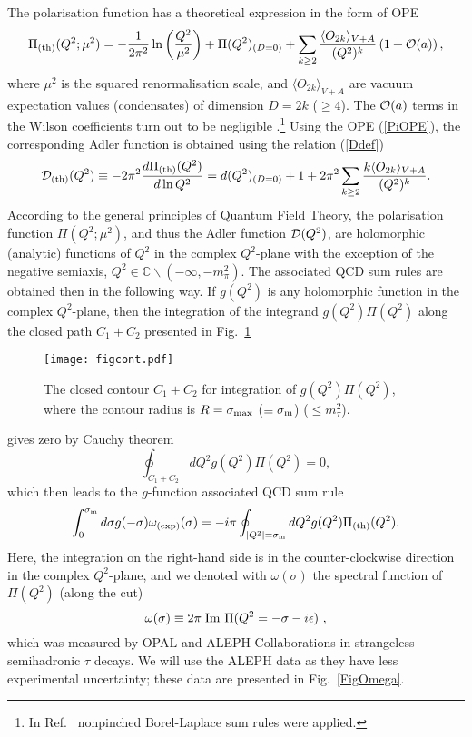 \documentclass[aps,nofootinbib,showkeys,noshowpacs,preprintnumbers,amsmath,amssymb]{revtex4}
\def\be{\begin{equation}}
\def\ee{\end{equation}}
\newcommand{\sm}{{\sigma_{\rm m}}}
\begin{document}
The polarisation function has a theoretical expression in the form of OPE \cite{SVZ}
\be
\Pi_{\rm (th)}(Q^2; \mu^2) = - \frac{1}{2 \pi^2} \ln \left( \frac{Q^2}{\mu^2} \right) + \Pi(Q^2)_{(D=0)} + \sum_{k \geq 2} \frac{ \langle O_{2 k} \rangle_{V+A}}{(Q^2)^k} \left( 1 + {\cal O}(a) \right),
\label{PiOPE}
\ee
where $\mu^2$ is the squared renormalisation scale, and $\langle O_{2 k} \rangle_{V+A}$ are vacuum expectation values (condensates) of dimension $D=2 k$ ($\geq 4$). The ${\cal O}(a)$ terms in the Wilson coefficients turn out to be negligible \cite{GCCV2012}.\footnote{In Ref.~\cite{GCCV2012} nonpinched Borel-Laplace sum rules were applied.}
Using the OPE (\ref{PiOPE}), the corresponding Adler function is obtained using the relation (\ref{Ddef})
\be
{\cal D}_{\rm (th)}(Q^2) \equiv  - 2 \pi^2 \frac{d \Pi_{\rm (th)}(Q^2)}{d \ln Q^2} = d(Q^2)_{(D=0)} + 1 + 2 \pi^2 \sum_{k \geq 2} \frac{k \langle O_{2 k} \rangle_{V+A}}{ (Q^2)^k}.
\label{DOPE}
\ee
According to the general principles of Quantum Field Theory, the polarisation function $\Pi(Q^2; \mu^2)$, and thus the Adler function ${\cal D}(Q^2)$, are holomorphic (analytic) functions of $Q^2$ in the complex $Q^2$-plane with the exception of the negative semiaxis, $Q^2 \in \mathbb{C} \backslash (-\infty, -m_{\pi}^2)$. The associated QCD sum rules are obtained then in the following way. If $g(Q^2)$ is any holomorphic function in the complex $Q^2$-plane, then the integration of the integrand $g(Q^2) \Pi(Q^2)$ along the closed path $C_1+C_2$ presented in Fig.~\ref{Figcont}
\begin{figure}[htb] %
\centering\texttt{[image: figcont.pdf]}
\caption{\footnotesize The closed contour $C_1+C_2$ for integration of $g(Q^2) \Pi(Q^2)$, where the contour radius is $R=\sigma_{\rm max}$ ($\equiv \sm$) ($\leq m_{\tau}^2$).}
\label{Figcont}
 \end{figure}
gives zero by Cauchy theorem
\be
\oint_{C_1+C_2} d Q^2 g(Q^2) \Pi(Q^2) =  0 ,
\label{Cauchy}
\ee
which then leads to the $g$-function associated QCD sum rule
\be
\int_0^{\sm} d \sigma g(-\sigma) \omega_{\rm (exp)}(\sigma)  =
-i \pi  \oint_{|Q^2|=\sm}
d Q^2 g(Q^2) \Pi_{\rm (th)}(Q^2) .
\label{sr1} \ee
Here, the integration on the right-hand side is in the counter-clockwise direction in the complex $Q^2$-plane, and we denoted with  $\omega(\sigma)$ the spectral function of $\Pi(Q^2)$ (along the cut)
\be
\omega(\sigma) \equiv 2 \pi \; {\rm Im} \ \Pi(Q^2=-\sigma - i \epsilon) \ ,
\label{om1}
\ee
which was measured by OPAL \cite{OPAL,PerisPC1} and ALEPH Collaborations \cite{ALEPH2,DDHMZ,ALEPHfin,ALEPHwww} in strangeless semihadronic $\tau$ decays. We will use the ALEPH data as they have less experimental uncertainty; these data are presented in Fig.~\ref{FigOmega}.
\end{document}

